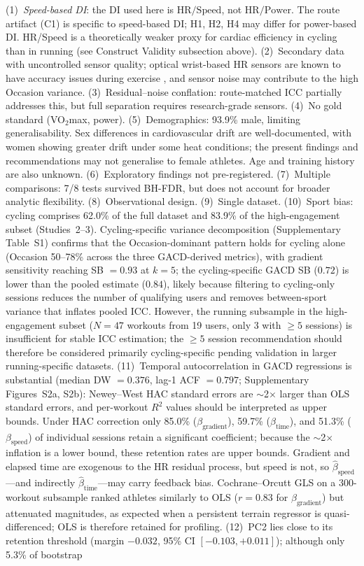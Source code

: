 \documentclass[times, twoside]{zHenriquesLab-StyleBioRxiv}
\begin{document}
(1)~\textit{Speed-based DI}: the DI used here is $\text{HR}/\text{Speed}$, not $\text{HR}/\text{Power}$. The route artifact (C1) is specific to speed-based DI; H1, H2, H4 may differ for power-based DI. HR/Speed is a theoretically weaker proxy for cardiac efficiency in cycling than in running (see Construct Validity subsection above). (2)~Secondary data with uncontrolled sensor quality; optical wrist-based HR sensors are known to have accuracy issues during exercise \cite{halson2014, gillinov2017, shcherbina2017}, and sensor noise may contribute to the high Occasion variance. (3)~Residual--noise conflation: route-matched ICC partially addresses this, but full separation requires research-grade sensors. (4)~No gold standard (VO$_2$max, power). (5)~Demographics: 93.9\% male, limiting generalisability. Sex differences in cardiovascular drift are well-documented, with women showing greater drift under some heat conditions; the present findings and recommendations may not generalise to female athletes. Age and training history are also unknown. (6)~Exploratory findings not pre-registered. (7)~Multiple comparisons: 7/8 tests survived BH-FDR, but does not account for broader analytic flexibility. (8)~Observational design. (9)~Single dataset. (10)~Sport bias: cycling comprises 62.0\% of the full dataset and 83.9\% of the high-engagement subset (Studies~2--3). Cycling-specific variance decomposition (Supplementary Table~S1) confirms that the Occasion-dominant pattern holds for cycling alone (Occasion 50--78\% across the three GACD-derived metrics), with gradient sensitivity reaching SB $= 0.93$ at $k = 5$; the cycling-specific GACD SB ($0.72$) is lower than the pooled estimate ($0.84$), likely because filtering to cycling-only sessions reduces the number of qualifying users and removes between-sport variance that inflates pooled ICC. However, the running subsample in the high-engagement subset ($N = 47$ workouts from 19 users, only 3 with $\geq 5$ sessions) is insufficient for stable ICC estimation; the $\geq 5$ session recommendation should therefore be considered primarily cycling-specific pending validation in larger running-specific datasets. (11)~Temporal autocorrelation in GACD regressions is substantial (median DW $= 0.376$, lag-1 ACF $= 0.797$; Supplementary Figures~S2a, S2b): Newey--West HAC standard errors are $\sim$2$\times$ larger than OLS standard errors, and per-workout $R^2$ values should be interpreted as upper bounds. Under HAC correction only 85.0\% ($\beta_{\text{gradient}}$), 59.7\% ($\beta_{\text{time}}$), and 51.3\% ($\beta_{\text{speed}}$) of individual sessions retain a significant coefficient; because the $\sim$2$\times$ inflation is a lower bound, these retention rates are upper bounds. Gradient and elapsed time are exogenous to the HR residual process, but speed is not, so $\hat{\beta}_{\text{speed}}$---and indirectly $\hat{\beta}_{\text{time}}$---may carry feedback bias. Cochrane--Orcutt GLS on a 300-workout subsample ranked athletes similarly to OLS ($r = 0.83$ for $\beta_{\text{gradient}}$) but attenuated magnitudes, as expected when a persistent terrain regressor is quasi-differenced; OLS is therefore retained for profiling. (12)~PC2 lies close to its retention threshold (margin $-0.032$, 95\% CI $[-0.103, +0.011]$); although only 5.3\% of bootstrap 
\end{document}

